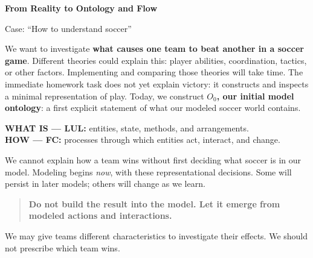 \documentclass[11pt,a4paper]{article}
\newcommand{\heading}[1]{\par\vspace{5pt}{\large\bfseries\color{ink}#1}\par}
\begin{document}
{\LARGE\bfseries\color{ink}From Reality to Ontology and Flow}\par
{\large Case: ``How to understand soccer''}

\heading{Our case and purpose}
We want to investigate \textbf{what causes one team to beat another in a soccer game}. Different theories could explain this: player abilities, coordination, tactics, or other factors. Implementing and comparing those theories will take time. The immediate homework task does not yet explain victory: it constructs and inspects a minimal representation of play. Today, we construct \textbf{$O_0$, our initial model ontology}: a first explicit statement of what our modeled soccer world contains.

\textbf{WHAT IS --- LUL:} entities, state, methods, and arrangements.\\
\textbf{HOW --- FC:} processes through which entities act, interact, and change.

We cannot explain how a team wins without first deciding what soccer is in our model. Modeling begins \emph{now}, with these representational decisions. Some will persist in later models; others will change as we learn.

\begin{quote}\large\bfseries Do not build the result into the model. Let it emerge from modeled actions and interactions.\end{quote}
We may give teams different characteristics to investigate their effects. We should not prescribe which team wins.
\end{document}
